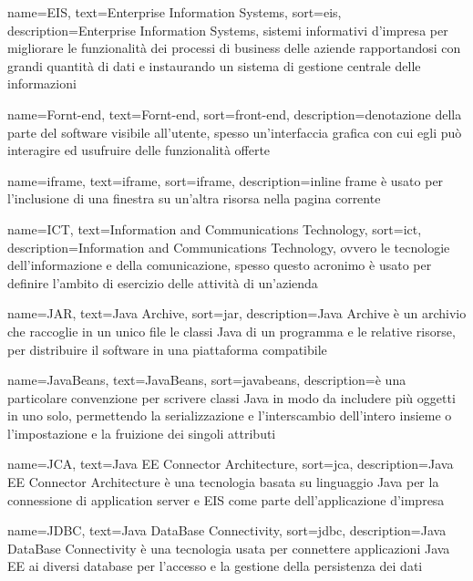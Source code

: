 {
    name=EIS,
    text=Enterprise Information Systems,
    sort=eis,
    description={Enterprise Information Systems, sistemi informativi d'impresa per migliorare le funzionalità dei processi di business delle aziende rapportandosi con grandi quantità di dati e instaurando un sistema di gestione centrale delle informazioni}
}

{
    name=Fornt-end,
    text=Fornt-end,
    sort=front-end,
    description={denotazione della parte del software visibile all'utente, spesso un'interfaccia grafica con cui egli può interagire ed usufruire delle funzionalità offerte}
}


{
    name=iframe,
    text=iframe,
    sort=iframe,
    description={inline frame è usato per l'inclusione di una finestra su un'altra risorsa nella pagina corrente}
}

{
    name=ICT,
    text=Information and Communications Technology,
    sort=ict,
    description={Information and Communications Technology, ovvero le tecnologie dell’informazione e della comunicazione, 
spesso questo acronimo è usato per definire l'ambito di esercizio delle attività di un'azienda}
}

{
    name=JAR,
    text=Java Archive,
    sort=jar,
    description={Java Archive è un archivio che raccoglie in un unico file le classi Java di un programma e le relative risorse, per distribuire il software in una piattaforma compatibile}
}

{
    name=JavaBeans,
    text=JavaBeans,
    sort=javabeans,
    description={è una particolare convenzione per scrivere classi Java in modo da includere più oggetti in uno solo, permettendo la serializzazione e l'interscambio dell'intero insieme o l'impostazione e la fruizione dei singoli attributi}
}

{
    name=JCA,
    text=Java EE Connector Architecture,
    sort=jca,
    description={Java EE Connector Architecture è una tecnologia basata su linguaggio Java per la connessione di application server e EIS come parte dell'applicazione d'impresa}
}

{
    name=JDBC,
    text=Java DataBase Connectivity,
    sort=jdbc,
    description={Java DataBase Connectivity è una tecnologia usata per connettere applicazioni Java EE ai diversi database per l'accesso e la gestione della persistenza dei dati}
}



